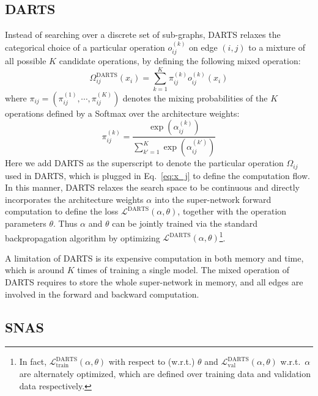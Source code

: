 \documentclass{article}
\newcommand{\neqref}{Eq.~\eqref}
\begin{document}
\subsection{DARTS}
\label{sec:relatedwork:DARTS}

Instead of searching over a discrete set of sub-graphs, DARTS relaxes the categorical choice of a particular operation $o_{ij}^{(k)}$ on edge $(i,j)$ to a mixture of all possible $K$ candidate operations, by defining the following mixed operation:
\begin{equation}
    \Omega_{ij}^{\text{DARTS}}(x_i) = \sum_{k=1}^K \pi_{ij}^{(k)} o_{ij}^{(k)}(x_i)
\end{equation}
where $\pi_{ij}=(\pi_{ij}^{(1)}, \cdots, \pi_{ij}^{(K)})$ denotes the mixing probabilities of the $K$ operations defined by a Softmax over the architecture weights:
\begin{equation}
    \pi_{ij}^{(k)}=\frac{\exp(\alpha_{ij}^{(k)})}{\sum_{k'=1}^{K} \exp(\alpha_{ij}^{(k')})}
    \label{eq:pi}
\end{equation}
Here we add DARTS as the superscript to denote the particular operation $\Omega_{ij}$ used in DARTS, which is plugged in \neqref{eq:x_j} to define the computation flow.
In this manner, DARTS relaxes the search space to be continuous and directly incorporates the architecture weights $\alpha$ into the super-network forward computation to define the loss $\mathcal{L}^{\text{DARTS}}(\alpha,\theta)$, together with the operation parameters $\theta$. Thus $\alpha$ and $\theta$ can be jointly trained via the standard backpropagation algorithm by optimizing $\mathcal{L}^{\text{DARTS}}(\alpha,\theta)$\footnote{In fact, $\mathcal{L}^{\text{DARTS}}_{\text{train}}(\alpha,\theta)$ with respect to (w.r.t.) $\theta$ and $\mathcal{L}^{\text{DARTS}}_{\text{val}}(\alpha,\theta)$ w.r.t.~$\alpha$ are alternately optimized, which are defined over training data and validation data respectively.}.

A limitation of DARTS is its expensive computation in both memory and time, which is around $K$ times of training a single model.
The mixed operation of DARTS requires to store the whole super-network in memory, and all edges are involved in the forward and backward computation.
\vspace{-2mm}

\subsection{SNAS}
\label{sec:relatedwork:SNAS}
\end{document}
